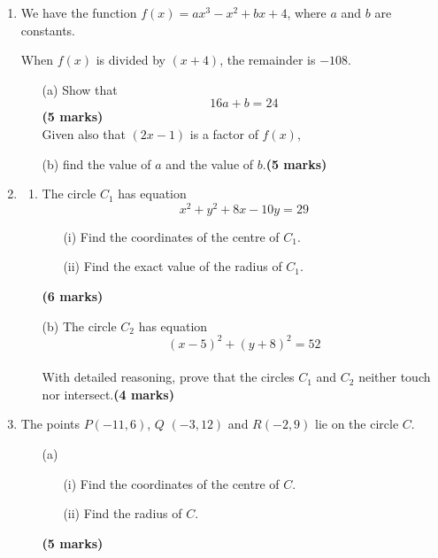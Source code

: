 \documentclass{../Templates/sbs-exam}
\newcommand{\imarks}[1]{\hfill \textbf{(#1 marks)}}
\begin{document}
\begin{enumerate}
\begin{enumerate}
    \item[(ii)] Use algebra to prove by exhaustion that for all $n \in \mathbb{N}$:
    \[
    \text{``}n^2 - 2 \text{ is not a multiple of } 4\text{"}
    \]\imarks{6}
\end{enumerate}


\vspace{8cm}

\item %
We have the function $f(x) = ax^{3}-x^{2}+bx + 4$, where $a$ and $b$ are constants.

When $f(x)$ is divided by $(x + 4)$, the remainder is $- 108$.

\begin{enumerate}
    \item[(a)] Show that
    \[
    16a + b=24
    \]\imarks{5}\\
    Given also that $(2x - 1)$ is a factor of $f(x)$,
    \item[(b)] find the value of $a$ and the value of $b$.\imarks{5}
\end{enumerate}

\vspace{8cm}

\item %

\begin{enumerate}
    \item The circle \(C_1\) has equation
    \[
    x^2 + y^2 + 8x - 10y = 29
    \]
    \begin{enumerate}
        \item[(i)] Find the coordinates of the centre of \(C_1\).
        \item[(ii)] Find the exact value of the radius of \(C_1\).
    \end{enumerate}\imarks{6}
    \item[(b)] The circle \(C_2\) has equation
    \[
    (x - 5)^2 + (y + 8)^2 = 52
    \]\\
    With detailed reasoning, prove that the circles \(C_1\) and \(C_2\) neither touch nor intersect.\imarks{4}
\end{enumerate}

\vspace{8cm}

\item %


The points \( P \)\( (-11, 6) \),  \( Q \) \( (-3, 12) \) and \( R \)\( (-2, 9) \) lie on the circle \( C \).

\begin{enumerate}
    \item[(a)] 
    \begin{enumerate}
        \item[(i)] Find the coordinates of the centre of \( C \).
        \item[(ii)] Find the radius of \( C \).
    \end{enumerate}
    \imarks{5}
    

\end{enumerate}
\end{enumerate}
\end{document}
